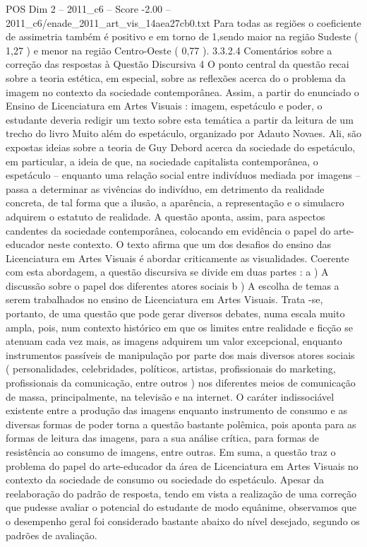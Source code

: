 \begin{textsample}{POS Dim 2 – 2011\_c6 – Score -2.00 – 2011\_c6/enade\_2011\_art\_vis\_14aea27cb0.txt}
Para todas as regiões o coeficiente de assimetria também é positivo e em torno de 1,sendo maior na região Sudeste ( 1,27 ) e menor na região Centro-Oeste ( 0,77 ). 3.3.2.4 Comentários sobre a correção das respostas à Questão Discursiva 4 O ponto central da questão recai sobre a teoria estética, em especial, sobre as reflexões acerca do o problema da imagem no contexto da sociedade contemporânea.
Assim, a partir do enunciado o Ensino de Licenciatura em Artes Visuais : imagem, espetáculo e poder, o estudante deveria redigir um texto sobre esta temática a partir da leitura de um trecho do livro Muito além do espetáculo, organizado por Adauto Novaes.
Ali, são expostas ideias sobre a teoria de Guy Debord acerca da sociedade do espetáculo, em particular, a ideia de que, na sociedade capitalista contemporânea, o espetáculo – enquanto uma relação social entre indivíduos mediada por imagens – passa a determinar as vivências do indivíduo, em detrimento da realidade concreta, de tal forma que a ilusão, a aparência, a representação e o simulacro adquirem o estatuto de realidade.
A questão aponta, assim, para aspectos candentes da sociedade contemporânea, colocando em evidência o papel do arte-educador neste contexto.
O texto afirma que um dos desafios do ensino das Licenciatura em Artes Visuais é abordar criticamente as visualidades.
Coerente com esta abordagem, a questão discursiva se divide em duas partes : a ) A discussão sobre o papel dos diferentes atores sociais b ) A escolha de temas a serem trabalhados no ensino de Licenciatura em Artes Visuais.
Trata -se, portanto, de uma questão que pode gerar diversos debates, numa escala muito ampla, pois, num contexto histórico em que os limites entre realidade e ficção se atenuam cada vez mais, as imagens adquirem um valor excepcional, enquanto instrumentos passíveis de manipulação por parte dos mais diversos atores sociais ( personalidades, celebridades, políticos, artistas, profissionais do marketing, profissionais da comunicação, entre outros ) nos diferentes meios de comunicação de massa, principalmente, na televisão e na internet.
O caráter indissociável existente entre a produção das imagens enquanto instrumento de consumo e as diversas formas de poder torna a questão bastante polêmica, pois aponta para as formas de leitura das imagens, para a sua análise crítica, para formas de resistência ao consumo de imagens, entre outras.
Em suma, a questão traz o problema do papel do arte-educador da área de Licenciatura em Artes Visuais no contexto da sociedade de consumo ou sociedade do espetáculo.
Apesar da reelaboração do padrão de resposta, tendo em vista a realização de uma correção que pudesse avaliar o potencial do estudante de modo equânime, observamos que o desempenho geral foi considerado bastante abaixo do nível desejado, segundo os padrões de avaliação.

\end{textsample}
